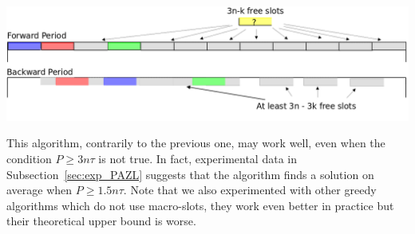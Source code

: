\documentclass[a4paper,10pt]{article}
\begin{document}
      \begin{center}
      \includegraphics[scale=0.3]{ex3nt.png}
      \end{center}
% 
% 
% 
	
This algorithm, contrarily to the previous one, may work well, even when the condition $P \geq 3n\tau$ is not true.
In fact, experimental data in Subsection~\ref{sec:exp_PAZL} suggests that the algorithm finds a solution on average when $P \geq 1.5 n\tau$.
Note that we also experimented with other greedy algorithms which do not use macro-slots, they work even better in practice but their theoretical upper bound is worse.
\end{document}
